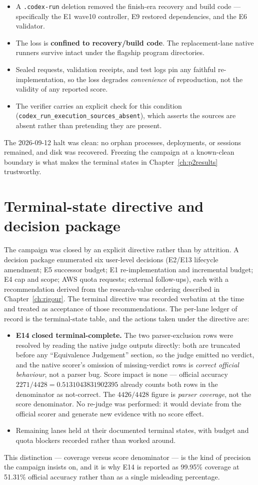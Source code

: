 \begin{itemize}[leftmargin=1.4em,itemsep=2pt]
  \item A \texttt{.codex-run} deletion removed the finish-era recovery and build
  code --- specifically the E1 wave10 controller, E9 restored dependencies, and
  the E6 validator.
  \item The loss is \textbf{confined to recovery/build code}. The replacement-lane
  native runners survive intact under the flagship program directories.
  \item Sealed requests, validation receipts, and test logs pin any faithful
  re-implementation, so the loss degrades \emph{convenience} of reproduction, not
  the validity of any reported score.
  \item The verifier carries an explicit check for this condition
  (\texttt{codex\_run\_execution\_sources\_absent}), which asserts the sources are
  absent rather than pretending they are present.
\end{itemize}

The 2026-09-12 halt was clean: no orphan processes, deployments, or sessions
remained, and disk was recovered. Freezing the campaign at a known-clean boundary
is what makes the terminal states in Chapter~\ref{ch:p2results} trustworthy.

\section{Terminal-state directive and decision package}

The campaign was closed by an explicit directive rather than by attrition. A
decision package enumerated six user-level decisions (E2/E13 lifecycle amendment;
E5 successor budget; E1 re-implementation and incremental budget; E4 cap and
scope; AWS quota requests; external follow-ups), each with a recommendation
derived from the research-value ordering described in Chapter~\ref{ch:rigour}.
The terminal directive was recorded verbatim at the time and treated as
acceptance of those recommendations. The per-lane ledger of record is the
terminal-state table, and the actions taken under the directive are:

\begin{itemize}[leftmargin=1.4em,itemsep=2pt]
  \item \textbf{E14 closed terminal-complete.} The two parser-exclusion rows were
  resolved by reading the native judge outputs directly: both are truncated before
  any ``Equivalence Judgement'' section, so the judge emitted no verdict, and the
  native scorer's omission of missing-verdict rows is \emph{correct official
  behaviour}, not a parser bug. Score impact is none --- official accuracy
  $2271/4428 = 0.5131043831902395$ already counts both rows in the denominator as
  not-correct. The $4426/4428$ figure is \emph{parser coverage}, not the score
  denominator. No re-judge was performed: it would deviate from the official
  scorer and generate new evidence with no score effect.
  \item Remaining lanes held at their documented terminal states, with budget and
  quota blockers recorded rather than worked around.
\end{itemize}

This distinction --- coverage versus score denominator --- is the kind of
precision the campaign insists on, and it is why E14 is reported as 99.95\%
coverage at 51.31\% official accuracy rather than as a single misleading
percentage.
